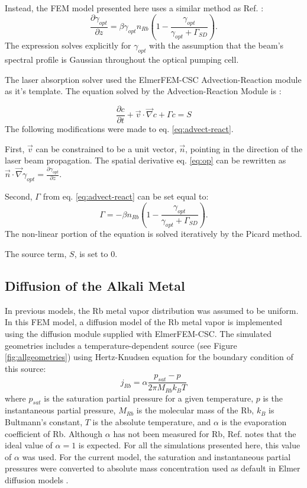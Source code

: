 Instead, the FEM model presented here uses a similar method as Ref. \cite{Fink2005}:
\begin{equation}
    \frac{\partial\gamma_{opt}}{\partial z} = \beta \gamma_{opt} n_{Rb}\left(1-\frac{\gamma_{opt}}{\gamma_{opt}+\Gamma_{SD}}\right).
    \label{eq:op}
\end{equation}
The expression solves explicitly for $\gamma_{opt}$ with the assumption that the beam's spectral profile is Gaussian throughout the optical pumping cell. 

The laser absorption solver used the ElmerFEM-CSC Advection-Reaction module as it's template. The equation solved by the Advection-Reaction Module is \cite{Raback2015}: 

\begin{equation}
    \frac{\partial c}{\partial t}+\vec{v}\cdot\vec{\nabla} c+\Gamma c = S
    \label{eq:advect-react}
\end{equation}
The following modifications were made to eq. \ref{eq:advect-react}.

First, $\vec{v}$ can be constrained to be a unit vector, $\vec{n}$, pointing in the direction of the laser beam propagation. The spatial derivative eq. \ref{eq:op} can be rewritten as  $\vec{n} \cdot \vec{\nabla}\gamma_{opt} = \frac{\partial\gamma_{opt}}{\partial z}$.

Second, $\Gamma$ from eq. \ref{eq:advect-react} can be set equal to:
\begin{equation}
    \Gamma=-\beta n_{Rb} \left(1-\frac{\gamma_{opt}}{\gamma_{opt}+\Gamma_{SD}}\right).
\end{equation}
The non-linear portion of the equation is solved iteratively by the Picard method. 

The source term, $S$, is set to 0.
\subsection{\label{sec:alkalidiff} Diffusion of the Alkali Metal}
In previous models, the Rb metal vapor distribution was assumed to be uniform.  In this FEM model, a diffusion model of the Rb metal vapor is implemented using the diffusion module supplied with ElmerFEM-CSC. The simulated geometries includes a temperature-dependent source (see Figure \ref{fig:allgeometries}) using Hertz-Knudsen equation for the boundary condition of this source\cite{Fink2007}:
\begin{equation}
    j_{Rb}=\alpha\frac{p_{sat}-p}{2\pi M_{Rb}k_B T}
\end{equation}
where $p_{sat}$ is the saturation partial pressure for a given temperature, $p$ is the instantaneous partial pressure, $M_{Rb}$ is the molecular mass of the Rb, $k_B$ is Bultmann's constant, $T$ is the absolute temperature, and $\alpha$ is the evaporation coefficient of Rb. Although $\alpha$ has not been measured for Rb, Ref. \cite{Fink2007} notes that the ideal value of $\alpha=1$ is expected. For all the simulations presented here, this value of $\alpha$ was used. For the current model, the saturation and instantaneous partial pressures were converted to absolute mass concentration used as default in Elmer diffusion models \cite{Raback2015}.

